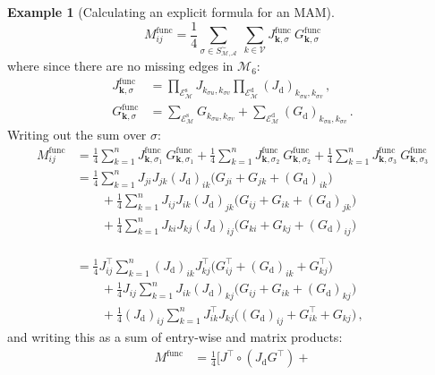 \documentclass[12pt,draft]{ociamthesis}
\theoremstyle{plain}
\theoremstyle{definition}
\newtheorem{example}{Example}[chapter]
\theoremstyle{remark}
\newcommand\ca[1]{\mathcal{#1}}
\begin{document}
\begin{example}[Calculating an explicit formula for an MAM]
$$
M^\mathrm{func}_{i j} = \frac{1}{4} \sum_{\sigma \in S_\ca{M,A}^\sim} \
\sum_{k \in \ca{V}} J^\mathrm{func}_{\mathbf{k},\sigma} \
G^\mathrm{func}_{\mathbf{k},\sigma}
$$
%
where since there are no missing edges in $\ca{M}_6$:
%
\begin{align*}
%
J^\mathrm{func}_{\mathbf{k},\sigma}
&= \prod_{\ca{E}_\ca{M}^\mathrm{s}} J_{k_{\sigma u},k_{\sigma v}}
\prod_{\ca{E}_\ca{M}^\mathrm{d}} (J_\mathrm{d})_{k_{\sigma u},k_{\sigma
v}}\,, \\
%
G^\mathrm{func}_{\mathbf{k},\sigma}
&= \sum_{\ca{E}_\ca{M}^\mathrm{s}} G_{k_{\sigma u},k_{\sigma v}}
+ \sum_{\ca{E}_\ca{M}^\mathrm{d}} (G_\mathrm{d})_{k_{\sigma u},k_{\sigma
v}}\,.
%
\end{align*}
%
Writing out the sum over $\sigma$:
%
\begingroup
\allowdisplaybreaks
\begin{align*}
M^\mathrm{func}_{i j}
&= \frac{1}{4} \sum_{k=1}^n J^\mathrm{func}_{\mathbf{k},\sigma_1} \
G^\mathrm{func}_{\mathbf{k},\sigma_1} + \frac{1}{4} \sum_{k=1}^n
J^\mathrm{func}_{\mathbf{k},\sigma_2} \
G^\mathrm{func}_{\mathbf{k},\sigma_2} + \frac{1}{4} \sum_{k=1}^n
J^\mathrm{func}_{\mathbf{k},\sigma_3} \
G^\mathrm{func}_{\mathbf{k},\sigma_3} \\
%
&=         \frac{1}{4} \sum_{k=1}^n J_{j i} J_{j k} (J_\mathrm{d})_{i k}
\big(G_{j i} + G_{j k} + (G_\mathrm{d})_{i k}\big) \\
& \qquad + \frac{1}{4} \sum_{k=1}^n J_{i j} J_{i k} (J_\mathrm{d})_{j k}
\big(G_{i j} + G_{i k} + (G_\mathrm{d})_{j k}\big) \\
& \qquad + \frac{1}{4} \sum_{k=1}^n J_{k i} J_{k j} (J_\mathrm{d})_{i j}
\big(G_{k i} + G_{k j} + (G_\mathrm{d})_{i j}\big) \\
%
& \\
& \\
& \\
&=         \frac{1}{4} J^\top_{i j} \sum_{k=1}^n (J_\mathrm{d})_{i k}
J^\top_{k j} \big(G^\top_{i j} + (G_\mathrm{d})_{i k} + G^\top_{k j}\big) \\
& \qquad + \frac{1}{4} J_{i j} \sum_{k=1}^n J_{i k}
(J_\mathrm{d})_{k j} \big(G_{i j} + G_{i k} + (G_\mathrm{d})_{k j}\big) \\
& \qquad + \frac{1}{4} (J_\mathrm{d})_{i j}
\sum_{k=1}^n J^\top_{i k} J_{k j}
\big((G_\mathrm{d})_{i j} + G^\top_{i k} + G_{k j}\big) \,,
\end{align*}
\endgroup
%
and writing this as a sum of entry-wise and matrix products:
%
\begin{align*}
M^\textrm{func} &= \frac{1}{4} \Big[ J^\top \circ (J_\mathrm{d} G^\top) +

\end{align*}
\end{example}
\end{document}
